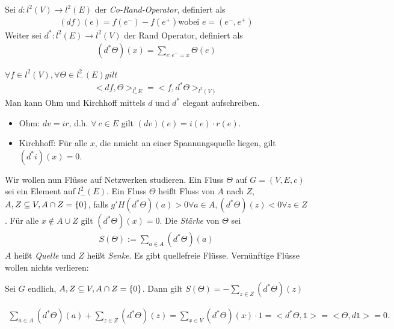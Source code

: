 \begin{definition}
	Sei $d:l^2(V) \to l^2(E)$ der \emph{Co-Rand-Operator}, definiert als
	\begin{gather}
		(df)(e) =  f(e^-) - f(e^+) \text{wobei } e= (e^-,e^+)
	\end{gather}
	Weiter sei $d^*: l^2(E) \to l^2(V)$ der Rand Operator, definiert als
	\begin{gather}
		(d^*\Theta)(x) = \sum\limits_{e:e^-=x} \Theta(e)
	\end{gather}
\end{definition}
\begin{uebung}
	$\forall f \in l^2(V), \forall \Theta \in l^2_-(E)gilt$
	\begin{gather}
		<df,\Theta>_{l^2_-E} = <f,d^*\Theta>_{l^2(V)}
	\end{gather}
	Man kann Ohm und Kirchhoff mittels $d$ und $d^*$ elegant aufschreiben.
	\begin{itemize}
		\item Ohm: $dv = ir$, d.h. $\forall \ c \in E$ gilt $(dv)(e) = i(e) \cdot r(e)$.
		\item Kirchhoff: Für alle $x$, die nmicht an einer Spannungsquelle liegen, gilt $(d^*i)(x)= 0$.
	\end{itemize}
\end{uebung}
Wir wollen nun Flüsse auf Netzwerken studieren. Ein Fluss $\Theta$ auf $G = (V,E,c)$ sei ein Element auf $l^2_-(E)$. Ein Fluss $\Theta$ heißt Fluss von $A$ nach $Z$, $A,Z \subseteq V, A \cap Z = \{0\}$, falls $g'H (d^*\Theta)(a) > 0 \forall a\in A , (d^*\Theta)(z)<0 \forall z \in Z$. Für alle $x \notin A\cup Z$ gilt $(d^*\Theta)(x) = 0$. Die \emph{Stärke} von $\Theta$ sei 
\begin{gather}
	S(\Theta) :=\sum\limits_{a \in A}(d^*\Theta)(a)
\end{gather}
$A$ heißt \emph{Quelle} und $Z$ heißt \emph{Senke}. Es gibt quellefreie  Flüsse. Vernünftige Flüsse wollen nichts verlieren:
\begin{lemma}
	Sei $G$ endlich, $A,Z \subseteq V, A \cap Z = \{0\}$. Dann gilt $S(\Theta) = -\sum\limits_{z \in Z}(d^*\Theta)(z)$ 
\end{lemma} 
\begin{beweis}
	\begin{gather}
		\sum\limits_{a \in A} (d^*\Theta)(a) + \sum\limits_{z \in Z} (d^*\Theta)(z) = \sum\limits_{x \in V}(d^*\Theta)(x) \cdot 1 = <d^*\Theta,\mathds{1}> = <\Theta,d \mathds{1}> = 0.
	\end{gather}
\end{beweis}

